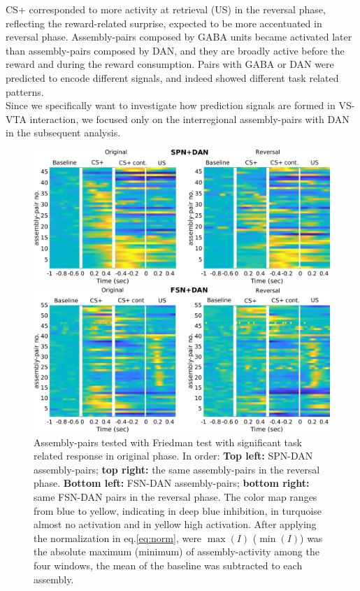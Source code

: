 CS+ corresponded to more activity at retrieval (US) in the reversal phase, reflecting the reward-related surprise, expected to be more accentuated in reversal phase. Assembly-pairs composed by GABA units became activated later than assembly-pairs composed by DAN, and they are broadly active before the reward and during the reward consumption. Pairs with GABA or DAN were predicted to encode different signals, and indeed showed different task related patterns.\\Since we specifically want to investigate how prediction signals are formed in VS-VTA interaction, we focused only on the interregional assembly-pairs with DAN in the subsequent analysis.\\
 \begin{figure}
     \centering
     \includegraphics[scale=0.32]{figures/SPN_DAN.pdf}
     
     \vspace{1cm}
     
     \includegraphics[scale=0.32]{figures/HeatFSN_DAN.pdf}
     \caption{Assembly-pairs tested with Friedman test with significant task related response in original phase. In order: \textbf{Top left:} SPN-DAN assembly-pairs; \textbf{top right:} the same assembly-pairs in the reversal phase. \textbf{Bottom left:} FSN-DAN assembly-pairs; \textbf{bottom right:} same FSN-DAN pairs in the reversal phase. The color map ranges from blue to yellow, indicating in deep blue inhibition, in turquoise almost no activation and in yellow high activation. After applying the normalization in eq.\ref{eq:norm}, were $\max(I)$ ($\min(I)$) was the absolute maximum (minimum) of assembly-activity among the four windows, the mean of the baseline was subtracted to each assembly.}
     \label{fig:HeatPairsDan}
 \end{figure}
